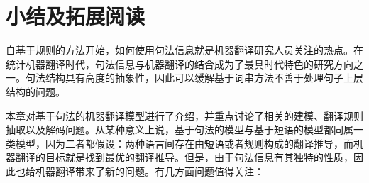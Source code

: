 \sectionnewpage
\section{小结及拓展阅读}

\parinterval 自基于规则的方法开始，如何使用句法信息就是机器翻译研究人员关注的热点。在统计机器翻译时代，句法信息与机器翻译的结合成为了最具时代特色的研究方向之一。句法结构具有高度的抽象性，因此可以缓解基于词串方法不善于处理句子上层结构的问题。

\parinterval 本章对基于句法的机器翻译模型进行了介绍，并重点讨论了相关的建模、翻译规则抽取以及解码问题。从某种意义上说，基于句法的模型与基于短语的模型都同属一类模型，因为二者都假设：两种语言间存在由短语或者规则构成的翻译推导，而机器翻译的目标就是找到最优的翻译推导。但是，由于句法信息有其独特的性质，因此也给机器翻译带来了新的问题。有几方面问题值得关注：

